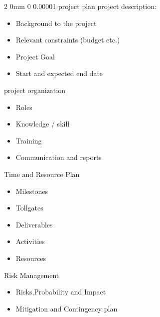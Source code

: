 \documentclass[a4paper,11pt]{article}
\makeatletter
\renewcommand{\subsection}{\@startsection
   {subsection}%
   {2}%
   {0mm}%
   {0\baselineskip}%
   {0.00001\baselineskip}%
   {\rmfamily\normalfont\slshape\normalsize}}%
\makeatother
\begin{document}
\begin{multicols}{2}
\subsection{project plan}
project description:
\vspace{0 mm}
\begin{itemize}
 \setlength\itemsep{0em}
\item Background to the project
\item Relevant constraints (budget etc.)
\item Project Goal
\item Start and expected end date
\end{itemize}
project organization
\vspace{0 mm}
\begin{itemize}
 \setlength\itemsep{0em}
\item Roles
\item Knowledge / skill
\item Training
\item Communication and reports
\end{itemize}
Time and Resource Plan
\vspace{0 mm}
\begin{itemize}
 \setlength\itemsep{0em}
\item Milestones
\item Tollgates
\item Deliverables
\item Activities
\item Resources
\end{itemize}
Risk Management
\vspace{0 mm}
\begin{itemize}
 \setlength\itemsep{0em}
\item Risks,Probability and Impact
\item Mitigation and Contingency plan
\end{itemize}


\end{multicols}
\end{document}

